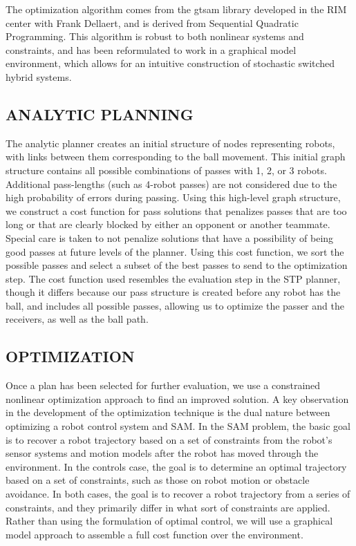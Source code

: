 \documentclass[a4paper, 10pt, conference]{ieeeconf}      %
\begin{document}
The optimization algorithm comes from the gtsam library\cite{Dellaert05rss} developed in the RIM center with Frank Dellaert, and is derived from Sequential Quadratic Programming. This algorithm is robust to both nonlinear systems and constraints, and has been reformulated to work in a graphical model environment, which allows for an intuitive construction of stochastic switched hybrid systems.

\subsection{ANALYTIC PLANNING}
The analytic planner creates an initial structure of nodes representing robots, with links between them corresponding to the ball movement. This initial graph structure contains all possible combinations of passes with 1, 2, or 3 robots. Additional pass-lengths (such as 4-robot passes) are not considered due to the high probability of errors during passing. Using this high-level graph structure, we construct a cost function for pass solutions that penalizes passes that are too long or that are clearly blocked by either an opponent or another teammate. Special care is taken to not penalize solutions that have a possibility of being good passes at future levels of the planner. Using this cost function, we sort the possible passes and select a subset of the best passes to send to the optimization step.
The cost function used resembles the evaluation step in the STP planner, though it differs because our pass structure is created before any robot has the ball, and includes all possible passes, allowing us to optimize the passer and the receivers, as well as the ball path.

\subsection{OPTIMIZATION}
Once a plan has been selected for further evaluation, we use a constrained nonlinear optimization approach to find an improved solution.  A key observation in the development of the optimization technique is the dual nature between optimizing a robot control system and SAM.  In the SAM problem, the basic goal is to recover a robot trajectory based on a set of constraints from the robot's sensor systems and motion models after the robot has moved through the environment.  In the controls case, the goal is to determine an optimal trajectory based on a set of constraints, such as those on robot motion or obstacle avoidance.  In both cases, the goal is to recover a robot trajectory from a series of constraints, and they primarily differ in what sort of constraints are applied.  Rather than using the formulation of optimal control, we will use a graphical model approach to assemble a full cost function over the environment.  
\end{document}

